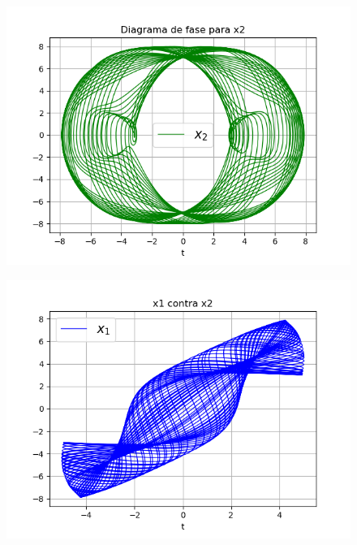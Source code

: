\documentclass{article}
\begin{document}
\begin{figure}[H]
	\centering
    \includegraphics[width=\linewidth]{33_f2.png}
\end{figure}
\begin{figure}[H]
	\centering
    \includegraphics[width=\linewidth]{33_v.png}
\end{figure}
\end{document}
